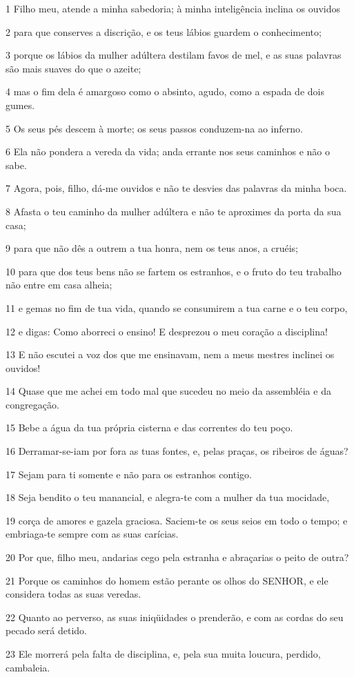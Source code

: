 \par 1 Filho meu, atende a minha sabedoria; à minha inteligência inclina os ouvidos
\par 2 para que conserves a discrição, e os teus lábios guardem o conhecimento;
\par 3 porque os lábios da mulher adúltera destilam favos de mel, e as suas palavras são mais suaves do que o azeite;
\par 4 mas o fim dela é amargoso como o absinto, agudo, como a espada de dois gumes.
\par 5 Os seus pés descem à morte; os seus passos conduzem-na ao inferno.
\par 6 Ela não pondera a vereda da vida; anda errante nos seus caminhos e não o sabe.
\par 7 Agora, pois, filho, dá-me ouvidos e não te desvies das palavras da minha boca.
\par 8 Afasta o teu caminho da mulher adúltera e não te aproximes da porta da sua casa;
\par 9 para que não dês a outrem a tua honra, nem os teus anos, a cruéis;
\par 10 para que dos teus bens não se fartem os estranhos, e o fruto do teu trabalho não entre em casa alheia;
\par 11 e gemas no fim de tua vida, quando se consumirem a tua carne e o teu corpo,
\par 12 e digas: Como aborreci o ensino! E desprezou o meu coração a disciplina!
\par 13 E não escutei a voz dos que me ensinavam, nem a meus mestres inclinei os ouvidos!
\par 14 Quase que me achei em todo mal que sucedeu no meio da assembléia e da congregação.
\par 15 Bebe a água da tua própria cisterna e das correntes do teu poço.
\par 16 Derramar-se-iam por fora as tuas fontes, e, pelas praças, os ribeiros de águas?
\par 17 Sejam para ti somente e não para os estranhos contigo.
\par 18 Seja bendito o teu manancial, e alegra-te com a mulher da tua mocidade,
\par 19 corça de amores e gazela graciosa. Saciem-te os seus seios em todo o tempo; e embriaga-te sempre com as suas carícias.
\par 20 Por que, filho meu, andarias cego pela estranha e abraçarias o peito de outra?
\par 21 Porque os caminhos do homem estão perante os olhos do SENHOR, e ele considera todas as suas veredas.
\par 22 Quanto ao perverso, as suas iniqüidades o prenderão, e com as cordas do seu pecado será detido.
\par 23 Ele morrerá pela falta de disciplina, e, pela sua muita loucura, perdido, cambaleia.

